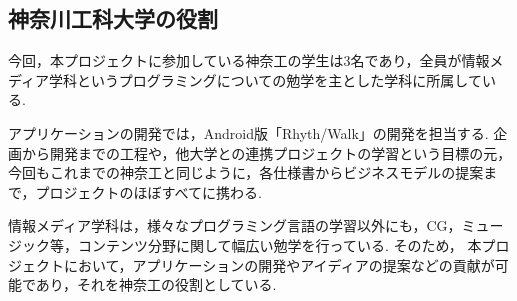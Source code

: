 \subsection{神奈川工科大学の役割}
\par
今回，本プロジェクトに参加している神奈工の学生は3名であり，全員が情報メディア学科というプログラミングについての勉学を主とした学科に所属している.
\par
アプリケーションの開発では，Android版「Rhyth/Walk」の開発を担当する.
企画から開発までの工程や，他大学との連携プロジェクトの学習という目標の元，今回もこれまでの神奈工と同じように，各仕様書からビジネスモデルの提案まで，プロジェクトのほぼすべてに携わる.
\par
情報メディア学科は，様々なプログラミング言語の学習以外にも，CG，ミュージック等，コンテンツ分野に関して幅広い勉学を行っている. そのため， 本プロジェクトにおいて，アプリケーションの開発やアイディアの提案などの貢献が可能であり，それを神奈工の役割としている.
